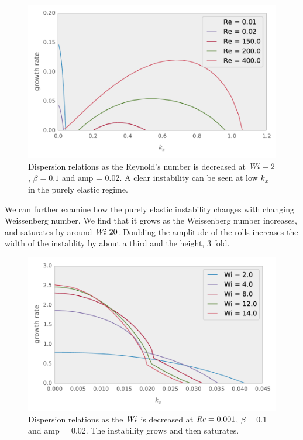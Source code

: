 \documentclass{jfm}
\newcommand\Wi{\mbox{\textit{Wi}}}
\newcommand\Rey{\mbox{\textit{Re}}}  %
\begin{document}
\begin{figure}
    \centering
    \includegraphics[width=\textwidth]{./figures/dispersions_varyRe}
    \caption{
	Dispersion relations as the Reynold's number is decreased at $\Wi = 2$,
	$\beta=0.1$ and amp = 0.02. A clear instability can be seen at low
	$k_{x}$ in the purely elastic regime.
    }
    \label{fig:dispersions_varyRe}
\end{figure}

We can further examine how the purely elastic instability changes with changing
Weissenberg number. We find that it grows as the Weissenberg number increases,
and saturates by around $\Wi ~ 20$. Doubling the amplitude of the rolls
increases the width of the instablity by about a third and the height, 3 fold.  

\begin{figure}
    \centering
    \includegraphics[width=\textwidth]{./figures/dispersions_varyWi}
    \caption{
	Dispersion relations as the $\Wi$ is decreased at $\Rey = 0.001$,
	$\beta=0.1$ and amp = 0.02. The instability grows and then saturates.
    }
    \label{fig:dispersions_varyWi}
\end{figure}
\end{document}
